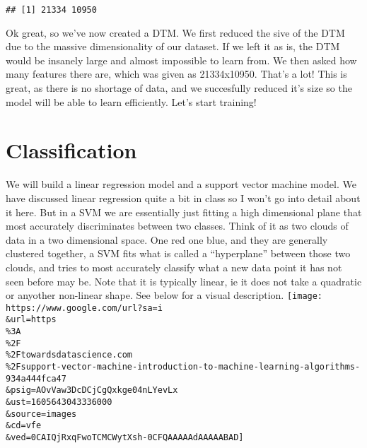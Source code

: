 \documentclass[
]{article}
\newenvironment{Shaded}{\begin{snugshade}}{\end{snugshade}}
\newcommand{\CommentTok}[1]{\textcolor[rgb]{0.56,0.35,0.01}{\textit{#1}}}
\newcommand{\DataTypeTok}[1]{\textcolor[rgb]{0.13,0.29,0.53}{#1}}
\newcommand{\DecValTok}[1]{\textcolor[rgb]{0.00,0.00,0.81}{#1}}
\newcommand{\KeywordTok}[1]{\textcolor[rgb]{0.13,0.29,0.53}{\textbf{#1}}}
\newcommand{\NormalTok}[1]{#1}
\newcommand{\OperatorTok}[1]{\textcolor[rgb]{0.81,0.36,0.00}{\textbf{#1}}}
\newcommand{\OtherTok}[1]{\textcolor[rgb]{0.56,0.35,0.01}{#1}}
\newcommand{\StringTok}[1]{\textcolor[rgb]{0.31,0.60,0.02}{#1}}
\begin{document}
\begin{Shaded}
\end{Shaded}

\begin{verbatim}
## [1] 21334 10950
\end{verbatim}

Ok great, so we've now created a DTM. We first reduced the sive of the
DTM due to the massive dimensionality of our dataset. If we left it as
is, the DTM would be insanely large and almost impossible to learn from.
We then asked how many features there are, which was given as
21334x10950. That's a lot! This is great, as there is no shortage of
data, and we succesfully reduced it's size so the model will be able to
learn efficiently. Let's start training!

\hypertarget{classification}{%
\section{Classification}\label{classification}}

We will build a linear regression model and a support vector machine
model. We have discussed linear regression quite a bit in class so I
won't go into detail about it here. But in a SVM we are essentially just
fitting a high dimensional plane that most accurately discriminates
between two classes. Think of it as two clouds of data in a two
dimensional space. One red one blue, and they are generally clustered
together, a SVM fits what is called a ``hyperplane'' between those two
clouds, and tries to most accurately classify what a new data point it
has not seen before may be. Note that it is typically linear, ie it does
not take a quadratic or anyother non-linear shape. See below for a
visual description.
\texttt{[image: https://www.google.com/url?sa=i\\\&url=https\\\%3A\\\%2F\\\%2Ftowardsdatascience.com\\\%2Fsupport-vector-machine-introduction-to-machine-learning-algorithms-934a444fca47\\\&psig=AOvVaw3DcDCjCgQxkge04nLYevLx\\\&ust=1605643043336000\\\&source=images\\\&cd=vfe\\\&ved=0CAIQjRxqFwoTCMCWytXsh-0CFQAAAAAdAAAAABAD]}
\end{document}
